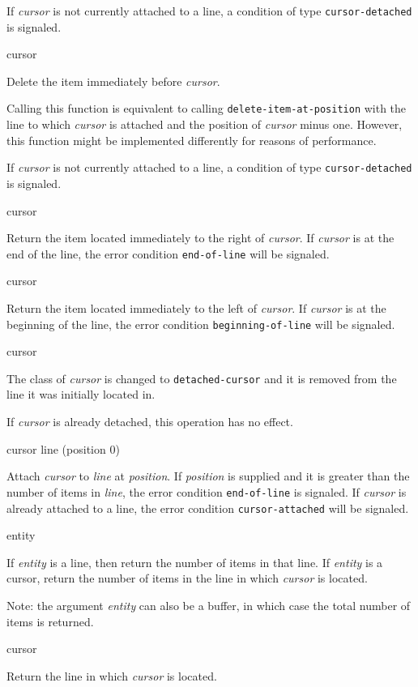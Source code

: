 If \textit{cursor} is not currently attached to a line, a condition
of type \texttt{cursor-detached} is signaled.

 {cursor}

Delete the item immediately before \emph{cursor}.

Calling this function is equivalent to calling
\texttt{delete-item-at-position} with the line to which
\textit{cursor} is attached and the position of \textit{cursor} minus
one.  However, this function might be implemented differently for
reasons of performance.

If \textit{cursor} is not currently attached to a line, a condition
of type \texttt{cursor-detached} is signaled.

 {cursor}

Return the item located immediately to the right of \textit{cursor}.
If \emph{cursor} is at the end of the line, the error condition
\texttt{end-of-line} will be signaled.

 {cursor}

Return the item located immediately to the left of \textit{cursor}.
If \emph{cursor} is at the beginning of the line, the error condition
\texttt{beginning-of-line} will be signaled.

 {cursor}

The class of \textit{cursor} is changed to \texttt{detached-cursor}
and it is removed from the line it was initially located in. 

If \textit{cursor} is already detached, this operation has no effect.

 {cursor line \optional (position 0)}

Attach \textit{cursor} to \textit{line} at \textit{position}.  If
\textit{position} is supplied and it is greater than the number of
items in \textit{line}, the error condition \texttt{end-of-line} is
signaled.  If \textit{cursor} is already attached to a line, the error
condition \texttt{cursor-attached} will be signaled.

 {entity}

If \textit{entity} is a line, then return the number of items in that
line.  If \textit{entity} is a cursor, return the number of items in
the line in which \textit{cursor} is located.

Note: the argument \textit{entity} can also be a buffer, in which case
the total number of items is returned.

 {cursor}

Return the line in which \textit{cursor} is located. 
